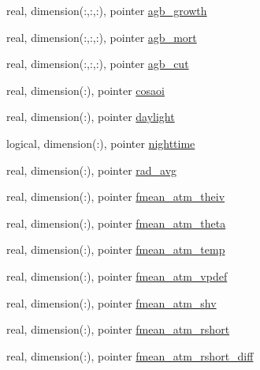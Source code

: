 \begin{DoxyCompactItemize}
\item 
real, dimension(\+:,\+:,\+:), pointer \hyperlink{structed__state__vars_1_1polygontype_abee8cb5fdb523b103da2250becff0e63}{agb\+\_\+growth}
\item 
real, dimension(\+:,\+:,\+:), pointer \hyperlink{structed__state__vars_1_1polygontype_afe5caed21e572226e0b841e87b41896f}{agb\+\_\+mort}
\item 
real, dimension(\+:,\+:,\+:), pointer \hyperlink{structed__state__vars_1_1polygontype_af1a7e6b13b6be14be176e2731cab99fa}{agb\+\_\+cut}
\item 
real, dimension(\+:), pointer \hyperlink{structed__state__vars_1_1polygontype_a2a884195dfca63618f0def827d864b71}{cosaoi}
\item 
real, dimension(\+:), pointer \hyperlink{structed__state__vars_1_1polygontype_a4b77bdc710f0b598487aeb7f55d88a50}{daylight}
\item 
logical, dimension(\+:), pointer \hyperlink{structed__state__vars_1_1polygontype_a619c056c86bd55f11f3298f20a70812b}{nighttime}
\item 
real, dimension(\+:), pointer \hyperlink{structed__state__vars_1_1polygontype_a97479e72418b9d5edf9c359083ec6a82}{rad\+\_\+avg}
\item 
real, dimension(\+:), pointer \hyperlink{structed__state__vars_1_1polygontype_aabb7f74265bc322b0f8fe534bbc3a4e2}{fmean\+\_\+atm\+\_\+theiv}
\item 
real, dimension(\+:), pointer \hyperlink{structed__state__vars_1_1polygontype_a26f812710fe654f9cc0318283762b830}{fmean\+\_\+atm\+\_\+theta}
\item 
real, dimension(\+:), pointer \hyperlink{structed__state__vars_1_1polygontype_a8487b68075b388920608fa2628794eda}{fmean\+\_\+atm\+\_\+temp}
\item 
real, dimension(\+:), pointer \hyperlink{structed__state__vars_1_1polygontype_aecf2553ac2bb6cb570ebd6834f6fe3bb}{fmean\+\_\+atm\+\_\+vpdef}
\item 
real, dimension(\+:), pointer \hyperlink{structed__state__vars_1_1polygontype_a2c2afe4d8e650e4ca73d5dd1af92dd40}{fmean\+\_\+atm\+\_\+shv}
\item 
real, dimension(\+:), pointer \hyperlink{structed__state__vars_1_1polygontype_a64708fa705fdd486d46101cffa275595}{fmean\+\_\+atm\+\_\+rshort}
\item 
real, dimension(\+:), pointer \hyperlink{structed__state__vars_1_1polygontype_a110614af42a432e5c7a991bda85ee2ac}{fmean\+\_\+atm\+\_\+rshort\+\_\+diff}
\item 

\end{DoxyCompactItemize}
